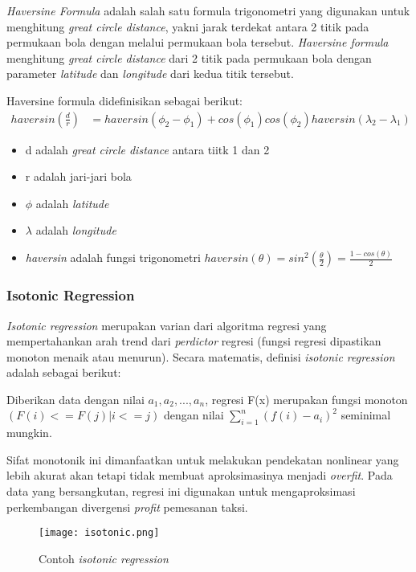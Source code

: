 \documentclass{article}
\begin{document}
\begin{adjustwidth}{4em}{0pt}
	
\hspace{\parindent}\textit{Haversine Formula} adalah salah satu formula trigonometri yang digunakan untuk menghitung \textit{great circle distance}, yakni jarak terdekat antara 2 titik pada permukaan bola dengan melalui permukaan bola tersebut. \textit{Haversine formula} menghitung \textit{great circle distance} dari 2 titik pada permukaan bola dengan parameter \textit{latitude} dan \textit{longitude} dari kedua titik tersebut.

Haversine formula didefinisikan sebagai berikut:
\begin{align*}
haversin(\frac{d}{r}) &= haversin(\phi _{2} - \phi _{1}) + cos(\phi _{1})cos(\phi _{2})haversin(\lambda _{2} - \lambda _{1})
\end{align*}
\begin{itemize}
	\setlength{\itemindent}{1cm}
	\item{d adalah \textit{great circle distance} antara tiitk 1 dan 2}
	\item{r adalah jari-jari bola}
	\item{$\phi$ adalah \textit{latitude}}
	\item{$\lambda$ adalah \textit{longitude}}
	\item{\textit{haversin} adalah fungsi trigonometri $haversin(\theta) = sin^2(\frac{\theta}{2}) = \frac{1-cos(\theta)}{2}$}
\end{itemize}

\end{adjustwidth}

\subsubsection{Isotonic Regression}
\begin{adjustwidth}{4em}{0pt}
	
\hspace{\parindent}\textit{Isotonic regression} merupakan varian dari algoritma regresi yang mempertahankan arah trend dari \textit{perdictor} regresi (fungsi regresi dipastikan monoton menaik atau menurun). Secara matematis, definisi \textit{isotonic regression} adalah sebagai berikut:

Diberikan data dengan nilai $a_1,a_2,...,a_n$, regresi F(x) merupakan fungsi monoton $(F(i) <= F(j) | i <= j)$  dengan nilai $\sum\limits_{i=1}^n({f(i)-a_{i}})^2$ seminimal mungkin.

Sifat monotonik ini dimanfaatkan untuk melakukan pendekatan  nonlinear yang lebih akurat akan tetapi tidak membuat aproksimasinya menjadi \textit{overfit}. Pada data yang bersangkutan, regresi ini digunakan untuk mengaproksimasi perkembangan divergensi \textit{profit} pemesanan taksi.

\begin{figure}[H]
	\centering
	\texttt{[image: isotonic.png]}
	\caption{Contoh \textit{isotonic regression}}
\end{figure}

\end{adjustwidth}
\end{document}
